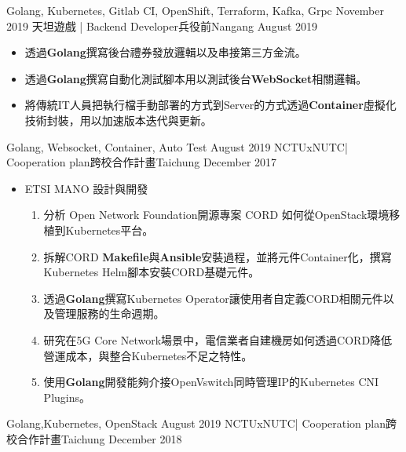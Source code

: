 \begin{experiences}
{\begin{itemize}
                      \end{itemize}
                    }
                    {Golang, Kubernetes, Gitlab CI, OpenShift, Terraform, Kafka, Grpc}
  \emptySeparator
  \experience
    {November 2019} {天坦遊戲 | Backend Developer}{兵役前}{Nangang}
    {August 2019}    {
                      \begin{itemize}
                        \item 透過\textbf{Golang}撰寫後台禮券發放邏輯以及串接第三方金流。
                        \item 透過\textbf{Golang}撰寫自動化測試腳本用以測試後台\textbf{WebSocket}相關邏輯。
                        \item 將傳統IT人員把執行檔手動部署的方式到Server的方式透過\textbf{Container}虛擬化技術封裝，用以加速版本迭代與更新。                	
                      \end{itemize}
                    }
                    {Golang, Websocket, Container, Auto Test}
  \emptySeparator
  \experience
    {August  2019}     { NCTUxNUTC| Cooperation plan}{跨校合作計畫}{Taichung}
    {December 2017}    {
                      \begin{itemize}
                        \item ETSI MANO 設計與開發
                        \begin{enumerate}
                        	\item 分析 Open Network Foundation開源專案 CORD 如何從OpenStack環境移植到Kubernetes平台。
                        	\item 拆解CORD \textbf{Makefile}與\textbf{Ansible}安裝過程，並將元件Container化，撰寫Kubernetes Helm腳本安裝CORD基礎元件。
                            \item 透過\textbf{Golang}撰寫Kubernetes Operator讓使用者自定義CORD相關元件以及管理服務的生命週期。
                            \item 研究在5G Core Network場景中，電信業者自建機房如何透過CORD降低營運成本，與整合Kubernetes不足之特性。
                             \item 使用\textbf{Golang}開發能夠介接OpenVswitch同時管理IP的Kubernetes CNI  Plugins。
                        \end{enumerate}
                      \end{itemize}
                    }
                    {Golang,Kubernetes, OpenStack}
\emptySeparator
\experience
    {August  2019}     { NCTUxNUTC| Cooperation plan}{跨校合作計畫}{Taichung}
    {December 2018}    {
}
\end{experiences}
